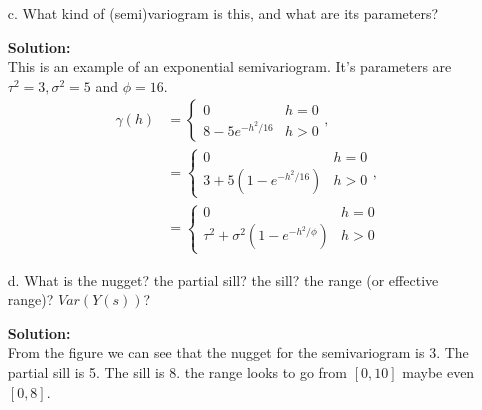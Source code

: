 \documentclass[12pt]{article}
\makeatletter
\theoremstyle{homework}
\newenvironment{exercise}[1]
{\def\@currentlabel{#1}\exercisecore}
{\endexercisecore}
\newcommand{\localhead}[1]{\par\smallskip\noindent\textbf{#1}\nobreak\\}%
\newcommand\solution{\localhead{Solution:}}
\makeatother
\begin{document}
\begin{exercise}{3}
\begin{enumerate}
    \item[c.] What kind of (semi)variogram is this, and what are its parameters?\\
    \solution This is an example of an exponential semivariogram. It's parameters are $\tau^2 = 3, \sigma^2 = 5$ and $\phi = 16$. 
    \begin{align*}
      \gamma(h) &= 
      \begin{cases}
        0 & h = 0\\
        8 - 5e^{-h^2/16} & h > 0
      \end{cases},\\
      &=
      \begin{cases}
        0 & h = 0\\
        3 + 5(1 - e^{-h^2/16}) & h > 0
      \end{cases},\\
      &=
      \begin{cases}
        0 & h = 0\\
        \tau^2 + \sigma^2(1 - e^{-h^2/\phi}) & h > 0
      \end{cases}
    \end{align*}
    

    \item[d.] What is the nugget? the partial sill? the sill? the range (or effective range)? $Var(Y(s))$?\\
    \solution  From the figure we can see that the nugget for the semivariogram is 3. The partial sill is 5. The sill is 8. the 
    range looks to go from $[0,10]$ maybe even $[0,8]$. 
  \end{enumerate}
  
\end{exercise}
\vspace{.5in}
\end{document}
